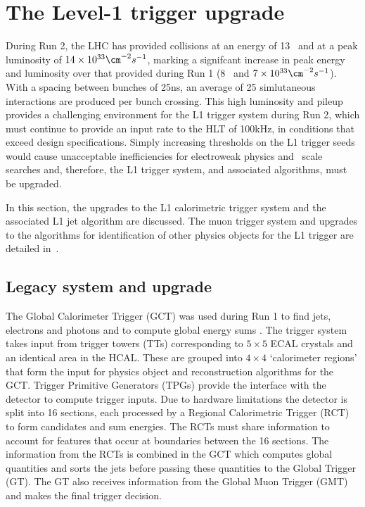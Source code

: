 \chapter{The Level-1 trigger upgrade} %
\label{cha:triggerUpgrade}

During Run 2, the LHC has provided collisions at an energy of 13 \TeV~and at  
a peak luminosity of $14\times10^{33}\cm^{-2}s^{-1}$, marking a signifcant increase
in peak energy and luminosity over that provided during Run 1 (8 \TeV~and $7\times10^{33}\cm^{-2}s^{-1}$).
With a spacing between bunches of 25ns, an average of 25 simlutaneous interactions are 
produced per bunch crossing. This high luminosity and pileup provides a challenging
environment for the L1 trigger system during Run 2, which must continue to provide 
an input rate to the HLT of 100kHz, in conditions that exceed design specifications. 
Simply increasing thresholds on the L1 trigger seeds would cause
unacceptable inefficiencies for electroweak physics and \TeV~scale searches
and, therefore, the L1 trigger system, and associated algorithms, must be upgraded. 

In this section, the upgrades to the L1 calorimetric trigger system and the 
associated L1 jet algorithm are discussed. The muon trigger system 
and upgrades to the algorithms for identification of other physics objects for 
the L1 trigger are detailed in~\cite{ele_algo,tau_algo,muon_algo}.


\section{Legacy system and upgrade}

The Global Calorimeter Trigger (GCT) was used during Run 1 to find jets, electrons and photons and to 
compute global energy sums \cite{gct}. The trigger system takes input from trigger towers (TTs) 
corresponding to $5\times5$ ECAL crystals and an identical area in the HCAL. 
These are grouped into $4\times4$ `calorimeter regions' that form the input for physics object and
reconstruction algorithms for the GCT. Trigger Primitive Generators (TPGs) provide the interface
with the detector to compute trigger inputs. Due to hardware limitations the detector is split into 16 
sections, each processed by a Regional Calorimetric Trigger (RCT) to form candidates and sum 
energies. The RCTs must share information to account for features that occur at boundaries between 
the 16 sections. The information from the RCTs is combined in the GCT which computes global quantities and sorts 
the jets before passing these quantities to the Global Trigger (GT). The GT also receives information 
from the Global Muon Trigger (GMT) and makes the final trigger decision. 

